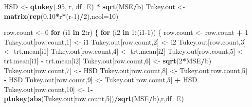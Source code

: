 \documentclass[
]{book}
\newenvironment{Shaded}{\begin{snugshade}}{\end{snugshade}}
\newcommand{\AttributeTok}[1]{\textcolor[rgb]{0.13,0.29,0.53}{#1}}
\newcommand{\ControlFlowTok}[1]{\textcolor[rgb]{0.13,0.29,0.53}{\textbf{#1}}}
\newcommand{\DecValTok}[1]{\textcolor[rgb]{0.00,0.00,0.81}{#1}}
\newcommand{\FunctionTok}[1]{\textcolor[rgb]{0.13,0.29,0.53}{\textbf{#1}}}
\newcommand{\NormalTok}[1]{#1}
\newcommand{\OtherTok}[1]{\textcolor[rgb]{0.56,0.35,0.01}{#1}}
\newcommand{\SpecialCharTok}[1]{\textcolor[rgb]{0.81,0.36,0.00}{\textbf{#1}}}
\begin{document}
\begin{Shaded}
\begin{Highlighting}[]
\NormalTok{HSD }\OtherTok{\textless{}{-}} \FunctionTok{qtukey}\NormalTok{(.}\DecValTok{95}\NormalTok{, r, df\_E) }\SpecialCharTok{*} \FunctionTok{sqrt}\NormalTok{(MSE}\SpecialCharTok{/}\NormalTok{b)}
\NormalTok{Tukey.out }\OtherTok{\textless{}{-}} \FunctionTok{matrix}\NormalTok{(}\FunctionTok{rep}\NormalTok{(}\DecValTok{0}\NormalTok{,}\DecValTok{10}\SpecialCharTok{*}\NormalTok{r}\SpecialCharTok{*}\NormalTok{(r}\DecValTok{{-}1}\NormalTok{)}\SpecialCharTok{/}\DecValTok{2}\NormalTok{),}\AttributeTok{ncol=}\DecValTok{10}\NormalTok{)}

\NormalTok{row.count }\OtherTok{\textless{}{-}} \DecValTok{0}
\ControlFlowTok{for}\NormalTok{ (i1 }\ControlFlowTok{in} \DecValTok{2}\SpecialCharTok{:}\NormalTok{r) \{}
  \ControlFlowTok{for}\NormalTok{ (i2 }\ControlFlowTok{in} \DecValTok{1}\SpecialCharTok{:}\NormalTok{(i1}\DecValTok{{-}1}\NormalTok{)) \{}
\NormalTok{    row.count }\OtherTok{\textless{}{-}}\NormalTok{ row.count }\SpecialCharTok{+} \DecValTok{1}
\NormalTok{    Tukey.out[row.count,}\DecValTok{1}\NormalTok{] }\OtherTok{\textless{}{-}}\NormalTok{ i1}
\NormalTok{    Tukey.out[row.count,}\DecValTok{2}\NormalTok{] }\OtherTok{\textless{}{-}}\NormalTok{ i2}
\NormalTok{    Tukey.out[row.count,}\DecValTok{3}\NormalTok{] }\OtherTok{\textless{}{-}}\NormalTok{ trt.mean[i1]}
\NormalTok{    Tukey.out[row.count,}\DecValTok{4}\NormalTok{] }\OtherTok{\textless{}{-}}\NormalTok{ trt.mean[i2]}
\NormalTok{    Tukey.out[row.count,}\DecValTok{5}\NormalTok{] }\OtherTok{\textless{}{-}}\NormalTok{ trt.mean[i1] }\SpecialCharTok{{-}}\NormalTok{ trt.mean[i2]}
\NormalTok{    Tukey.out[row.count,}\DecValTok{6}\NormalTok{] }\OtherTok{\textless{}{-}} \FunctionTok{sqrt}\NormalTok{(}\DecValTok{2}\SpecialCharTok{*}\NormalTok{MSE}\SpecialCharTok{/}\NormalTok{b)}
\NormalTok{    Tukey.out[row.count,}\DecValTok{7}\NormalTok{] }\OtherTok{\textless{}{-}}\NormalTok{ HSD}
\NormalTok{    Tukey.out[row.count,}\DecValTok{8}\NormalTok{] }\OtherTok{\textless{}{-}}\NormalTok{ Tukey.out[row.count,}\DecValTok{5}\NormalTok{] }\SpecialCharTok{{-}}\NormalTok{ HSD}
\NormalTok{    Tukey.out[row.count,}\DecValTok{9}\NormalTok{] }\OtherTok{\textless{}{-}}\NormalTok{ Tukey.out[row.count,}\DecValTok{5}\NormalTok{] }\SpecialCharTok{+}\NormalTok{ HSD}
\NormalTok{    Tukey.out[row.count,}\DecValTok{10}\NormalTok{] }\OtherTok{\textless{}{-}} 
      \DecValTok{1}\SpecialCharTok{{-}}\FunctionTok{ptukey}\NormalTok{(}\FunctionTok{abs}\NormalTok{(Tukey.out[row.count,}\DecValTok{5}\NormalTok{])}\SpecialCharTok{/}\FunctionTok{sqrt}\NormalTok{(MSE}\SpecialCharTok{/}\NormalTok{b),r,df\_E)}

\end{Highlighting}
\end{Shaded}
\end{document}
